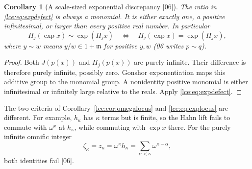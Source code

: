 \documentclass[11pt,letterpaper]{article}
\numberwithin{equation}{section}
\newtheorem{corollary}[theorem]{Corollary}
\theoremstyle{definition}
\theoremstyle{remark}
\newcommand{\infideal}{\mathfrak m}
\newcommand{\src}[1]{\textup{\textsf{\small[#1]}}}%
\begin{document}
\begin{corollary}[A scale-sized exponential discrepancy \src{06}]\label{lce:cs:cor:exp-scale}
The ratio in \eqref{lce:eq:expdefect} is always a monomial. It is either
exactly one, a positive infinitesimal, or larger than every positive real
number. In particular
\[
 H_j(\exp x)\sim\exp(H_j x)
 \quad\Longleftrightarrow\quad
 H_j(\exp x)=\exp(H_j x),
\]
where $y\sim w$ means $y/w\in1+\infideal$ for positive $y,w$ (06 writes
$p\sim q$).
\end{corollary}
\begin{proof}
Both $J(p(x))$ and $H_j(p(x))$ are purely infinite. Their difference is
therefore purely infinite, possibly zero. Gonshor exponentiation maps this
additive group to the monomial group. A nonidentity positive monomial is
either infinitesimal or infinitely large relative to the reals. Apply
\eqref{lce:eq:expdefect}.
\end{proof}
The two criteria of Corollary~\ref{lce:cor:omegalocus} and
\eqref{lce:eq:explocus} are different. For example, $h_\kappa$ has $\kappa$
terms but is finite, so the Hahn lift fails to commute with $\omega^x$ at
$h_\kappa$, while commuting with $\exp x$ there. For the purely infinite
omnific integer
\[
 \zeta_\kappa=z_\kappa=\omega^\kappa h_\kappa=\sum_{\alpha<\kappa}\omega^{\kappa-\alpha},
\]
both identities fail \src{06}.
\end{document}
